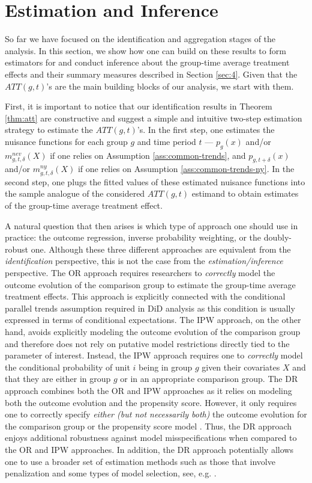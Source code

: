 \documentclass[11pt]{article}%
\theoremstyle{plain}
\numberwithin{sassumption}{section}
\numberwithin{equation}{section}
\begin{document}
\section{Estimation and Inference\label{sec:estimation}}

So far we have focused on the identification and aggregation stages of the
analysis. In this section, we show how one can build on these results to form
estimators for and conduct inference about the group-time average treatment effects
and their summary measures described in Section \ref{sec:4}. Given that
the $ATT\left(  g,t\right)  $'s are the main building blocks of our analysis,
we start with them. 

First, it is important to notice that our identification results in Theorem
\ref{thm:att} are constructive and suggest a simple and intuitive two-step
estimation strategy to estimate the $ATT\left(  g,t\right)  $'s. In the first
step, one estimates the nuisance functions for each group $g$ and time period
$t$ --- $p_{g}(x)$ and/or $m_{g,t,\delta}^{nev}\left(  X\right)  $ if one
relies on Assumption \ref{ass:common-trends}, and $p_{g,t+\delta}(x)$ and/or
$m_{g,t,\delta}^{ny}\left(  X\right)  $ if one relies on Assumption
\ref{ass:common-trends-ny}. In the second step, one plugs the fitted values of
these estimated nuisance functions into the sample analogue of the considered
$ATT\left(  g,t\right)  $ estimand to obtain estimates of the group-time
average treatment effect.

A natural question that then arises is which type of approach one should use
in practice: the outcome regression, inverse probability weighting, or the
doubly-robust one. Although these three different approaches are equivalent
from the \emph{identification} perspective, this is not the case from the
\emph{estimation/inference} perspective. The OR approach requires researchers
to \emph{correctly} model the outcome evolution of the comparison group to
estimate the group-time average treatment effects. This approach is explicitly
connected with the conditional parallel trends assumption required in DiD 
analysis as this condition is usually expressed in terms of conditional
expectations. The IPW approach, on the other hand, avoids explicitly modeling
the outcome evolution of the comparison group and therefore does not rely on
putative model restrictions directly tied to the parameter of interest.
Instead, the IPW approach requires one to \emph{correctly }model the
conditional probability of unit $i$ being in group $g$ given their covariates
$X$ and that they are either in group $g$ or in an appropriate comparison
group. The DR approach combines both the OR and IPW approaches as it relies on
modeling both the outcome evolution and the propensity score. However, it only
requires one to correctly specify \emph{either (but not necessarily both) }the
outcome evolution for the comparison group or the propensity score model
\citep{SantAnna2020}. Thus, the DR approach enjoys additional robustness
against model misspecifications when compared to the OR and IPW approaches. In
addition, the DR approach potentially allows one to use a broader set of
estimation methods such as those that involve penalization and some types of
model selection, see, e.g. \cite{Belloni2017}.
\end{document}

